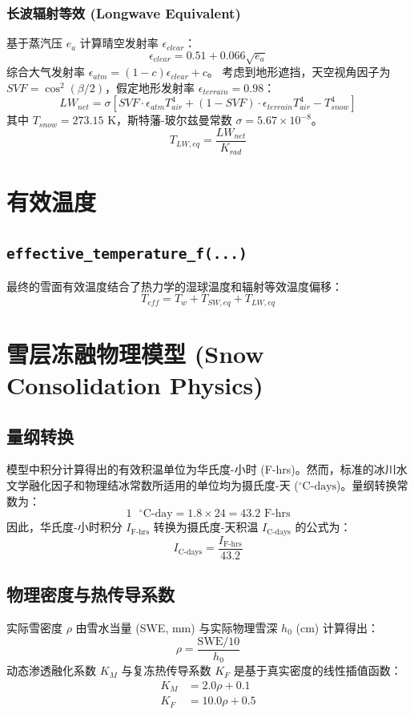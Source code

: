 \documentclass[11pt]{article}
\begin{document}
\subsubsection*{长波辐射等效 (Longwave Equivalent)}
基于蒸汽压 $e_a$ 计算晴空发射率 $\epsilon_{clear}$：
\[
\epsilon_{clear} = 0.51 + 0.066 \sqrt{e_a}
\]
综合大气发射率 $\epsilon_{atm} = (1 - c)\epsilon_{clear} + c$。
考虑到地形遮挡，天空视角因子为 $SVF = \cos^2(\beta / 2)$，假定地形发射率 $\epsilon_{terrain} = 0.98$：
\[
LW_{net} = \sigma \left[ SVF \cdot \epsilon_{atm} T_{air}^4 + (1 - SVF) \cdot \epsilon_{terrain} T_{air}^4 - T_{snow}^4 \right]
\]
其中 $T_{snow} = 273.15$ K，斯特藩-玻尔兹曼常数 $\sigma = 5.67 \times 10^{-8}$。
\[
T_{LW,eq} = \frac{LW_{net}}{K_{rad}}
\]

\section{有效温度}
\subsection{\texttt{effective\_temperature\_f(...)}}
最终的雪面有效温度结合了热力学的湿球温度和辐射等效温度偏移：
\[
T_{eff} = T_w + T_{SW,eq} + T_{LW,eq}
\]

\section{雪层冻融物理模型 (Snow Consolidation Physics)}
\subsection{量纲转换}
模型中积分计算得出的有效积温单位为华氏度-小时 (F-hrs)。然而，标准的冰川水文学融化因子和物理结冰常数所适用的单位均为摄氏度-天 ($^\circ\text{C-days}$)。量纲转换常数为：
\[
1 \text{ } ^\circ\text{C-day} = 1.8 \times 24 = 43.2 \text{ F-hrs}
\]
因此，华氏度-小时积分 $I_{\text{F-hrs}}$ 转换为摄氏度-天积温 $I_{\text{C-days}}$ 的公式为：
\[
I_{\text{C-days}} = \frac{I_{\text{F-hrs}}}{43.2}
\]

\subsection{物理密度与热传导系数}
实际雪密度 $\rho$ 由雪水当量 (SWE, mm) 与实际物理雪深 $h_0$ (cm) 计算得出：
\[
\rho = \frac{\text{SWE}/10}{h_0}
\]
动态渗透融化系数 $K_M$ 与复冻热传导系数 $K_F$ 是基于真实密度的线性插值函数：
\begin{align*}
K_M &= 2.0\rho + 0.1 \\
K_F &= 10.0\rho + 0.5
\end{align*}
\end{document}
